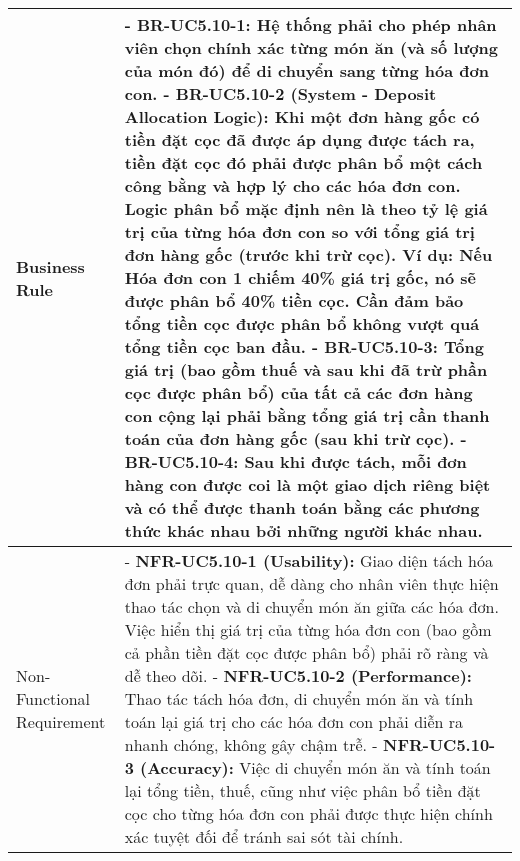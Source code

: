 \begin{longtable}{|m{4cm}|p{11cm}|}
Business Rule & - \textbf{BR-UC5.10-1:} Hệ thống phải cho phép nhân viên chọn chính xác từng món ăn (và số lượng của món đó) để di chuyển sang từng hóa đơn con. \newline - \textbf{BR-UC5.10-2 (System - Deposit Allocation Logic):} Khi một đơn hàng gốc có tiền đặt cọc đã được áp dụng được tách ra, tiền đặt cọc đó phải được phân bổ một cách công bằng và hợp lý cho các hóa đơn con. Logic phân bổ mặc định nên là theo tỷ lệ giá trị của từng hóa đơn con so với tổng giá trị đơn hàng gốc (trước khi trừ cọc). Ví dụ: Nếu Hóa đơn con 1 chiếm 40\% giá trị gốc, nó sẽ được phân bổ 40\% tiền cọc. Cần đảm bảo tổng tiền cọc được phân bổ không vượt quá tổng tiền cọc ban đầu. \newline - \textbf{BR-UC5.10-3:} Tổng giá trị (bao gồm thuế và sau khi đã trừ phần cọc được phân bổ) của tất cả các đơn hàng con cộng lại phải bằng tổng giá trị cần thanh toán của đơn hàng gốc (sau khi trừ cọc). \newline - \textbf{BR-UC5.10-4:} Sau khi được tách, mỗi đơn hàng con được coi là một giao dịch riêng biệt và có thể được thanh toán bằng các phương thức khác nhau bởi những người khác nhau. \\
\hline
Non-Functional Requirement & - \textbf{NFR-UC5.10-1 (Usability):} Giao diện tách hóa đơn phải trực quan, dễ dàng cho nhân viên thực hiện thao tác chọn và di chuyển món ăn giữa các hóa đơn. Việc hiển thị giá trị của từng hóa đơn con (bao gồm cả phần tiền đặt cọc được phân bổ) phải rõ ràng và dễ theo dõi. \newline - \textbf{NFR-UC5.10-2 (Performance):} Thao tác tách hóa đơn, di chuyển món ăn và tính toán lại giá trị cho các hóa đơn con phải diễn ra nhanh chóng, không gây chậm trễ. \newline - \textbf{NFR-UC5.10-3 (Accuracy):} Việc di chuyển món ăn và tính toán lại tổng tiền, thuế, cũng như việc phân bổ tiền đặt cọc cho từng hóa đơn con phải được thực hiện chính xác tuyệt đối để tránh sai sót tài chính. \\
\hline
\end{longtable}

